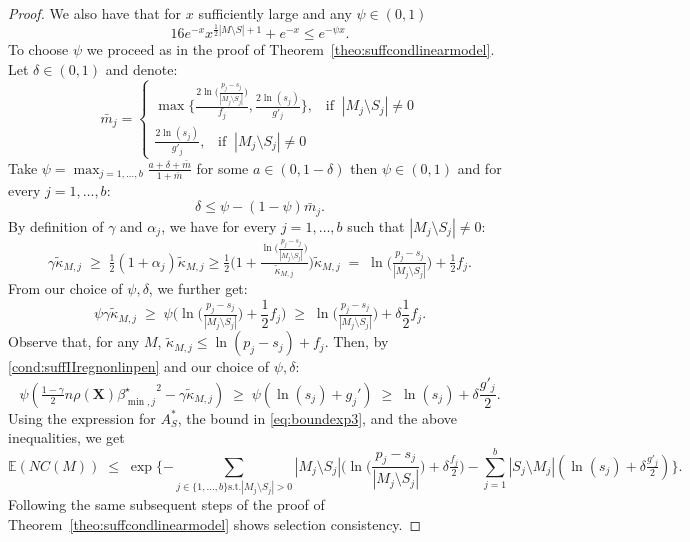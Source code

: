 \documentclass[aos]{imsart}
\theoremstyle{plain}
\newcommand{\E}{\mathbb{E}}
\newcommand{\bs}{\boldsymbol}
\begin{document}
\begin{proof}
We also have that for $x$ sufficiently large and any $\psi \in (0,1)$
\begin{equation}\label{eq:boundexp3}
16e^{-x}x^{\tfrac12|M\setminus S|+1}+e^{-x}\leq e^{-\psi x}.    
\end{equation}
To choose $\psi$ we proceed as in the proof of Theorem~\ref{theo:suffcondlinearmodel}. Let $\delta \in (0,1)$ and denote:
$$\bar{m}_j=\begin{cases}
    \max\bigg\{\tfrac{2\ln\big(\tfrac{p_j-s_j}{|M_j\setminus S_j|}\big)}{f_j},\tfrac{2\ln(s_j)}{g'_{j}}\bigg\},\;\;\; \text{if}\;\;|M_j \setminus S_j| \neq 0 \\
    \frac{2\ln(s_j)}{g'_{j}},\;\;\; \text{if}\;\;|M_j \setminus S_j| \neq 0
\end{cases}$$
Take $\psi=\max_{j=1, \ldots,b}\frac{a + \delta + \bar{m}}{1+\bar{m}}$ for some $a \in(0, 1- \delta)$ then $\psi \in (0,1)$ and for every $j=1,\ldots,b$:
$$\delta \leq \psi-(1-\psi)\bar{m}_j.$$ 
By definition of $\gamma$ and $\alpha_j$, we have for every $j=1,\ldots,b$ such that $|M_j \setminus S_j|\neq0$:
$$
\gamma\tilde{\kappa}_{M, j}\;\geq\;\tfrac12 (1+\alpha_j)\tilde{\kappa}_{M, j}\geq \tfrac12 \bigg(1+\tfrac{\ln\big(\tfrac{p_j-s_j}{|M_j\setminus S_j|}\big)}{\tilde{\kappa}_{M, j}}\bigg)\tilde{\kappa}_{M, j} \;=\; \ln\big(\tfrac{p_j-s_j}{|M_j\setminus S_j|}\big)+ \tfrac12f_j.
$$
From our choice of $\psi,\delta$, we further get:
$$\psi\gamma\tilde{\kappa}_{M, j} \;\geq\; \psi\bigg(\ln\big(\tfrac{p_j-s_j}{|M_j\setminus S_j|}\big)+ \frac12f_j\bigg) \;\geq\; \ln\big(\tfrac{p_j-s_j}{|M_j\setminus S_j|}\big)+ \delta\frac12f_j.$$
Observe that, for any $M$, $\tilde{\kappa}_{M, j} \leq \ln(p_j-s_j)+f_j$. Then, by \eqref{cond:suffIIregnonlinpen} and our choice of $\psi,\delta$:
$$\psi\left(\tfrac{1-\gamma}{2} n \rho(\bs X) {\beta^{\star}_{\min,j}}^{2} - \gamma\tilde{\kappa}_{M, j}\right) \;\geq\; \psi\left(\ln(s_j)+g_j'\right) \;\geq\; \ln(s_j)+\delta \frac{g'_j}{2}.
$$
Using the expression for $A_S^*$, the bound in \eqref{eq:boundexp3}, and the above inequalities, we get
$$
\E(NC(M))\;\leq\;\exp\{- \sum_{j \in \{1,\ldots, b\} \text{s.t.} |M_j \setminus S_j| > 0} |M_j\setminus S_j|\bigg(\ln\bigg(\frac{p_j-s_j}{|M_j\setminus S_j|}\bigg)+\delta \tfrac{f_j}{2}\bigg)-\sum_{j=1}^b |S_j\setminus M_j|(\ln(s_j)+\delta \tfrac{g'_j}{2})\}.
$$
Following the same subsequent steps of the proof of Theorem~\ref{theo:suffcondlinearmodel} shows selection consistency.
\end{proof}
\end{document}
